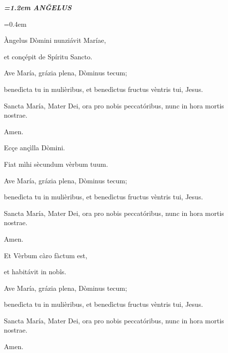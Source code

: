 \documentclass[twoside,10pt]{article}
\begin{document}
\pagestyle{empty}
{
  \medskip
  \begin{center}
  {\bfseries\itshape\large{}\font=1.2em \uppercase{anğelus}}
  \end{center}
  \medskip
}

{
  \setlength\parindent{2em}\font=0.4em

  \bigskip

   Àngelus Dòmini nunziávit Maríae,

  \smallskip

   et conçépit de Spíritu Sancto.

  \bigskip

  \noindent Ave María, grázia plena, Dòminus tecum;
  
  benedìcta tu in mulièribus, et benedìctus fructus vèntris tui, Jesus.

  Sancta María, Mater Dei, ora pro nobis peccatóribus, nunc in hora mortis nostrae.

  Amen.

  \bigskip

   Ecçe ançìlla Dòmini.

  \smallskip

   Fiat mìhi sècundum vèrbum tuum.

  \bigskip

  \noindent Ave María, grázia plena, Dòminus tecum;
  
  benedìcta tu in mulièribus, et benedìctus fructus vèntris tui, Jesus.

  Sancta María, Mater Dei, ora pro nobis peccatóribus, nunc in hora mortis nostrae.

  Amen.

  \bigskip

   Et Vèrbum càro fàctum est,

  \smallskip

   et habitávit in nobîs.

  \bigskip

  \noindent Ave María, grázia plena, Dòminus tecum;
  
  benedìcta tu in mulièribus, et benedìctus fructus vèntris tui, Jesus.

  Sancta María, Mater Dei, ora pro nobis peccatóribus, nunc in hora mortis nostrae.

  Amen.

}
\end{document}
